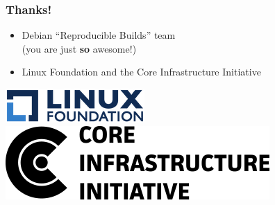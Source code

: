 \documentclass[14pt,aspectratio=169]{beamer}
\begin{document}
\begin{frame}
 \frametitle{Thanks!}

 \begin{itemize}
  \item Debian “Reproducible Builds” team \\
        {\small (you are just \textbf{so} awesome!)}
  \item Linux Foundation and the Core Infrastructure Initiative
\end{itemize}

 \begin{center}
  \includegraphics[height=0.1\paperheight]{images/linux_foundation_logo.png}
  \hspace{0.1\paperwidth}
  \includegraphics[height=0.1\paperheight]{images/cii_logo.png}
 \end{center}

 \vfill
 \begin{center}
 \end{center}
\end{frame}
\end{document}
